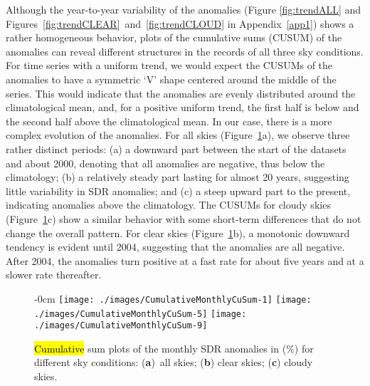\documentclass[applsci,article,accept,moreauthors,pdftex]{Definitions/mdpi}
\begin{document}
Although the year-to-year variability of the anomalies (Figure
\ref{fig:trendALL} and \mbox{Figures~\ref{fig:trendCLEAR} and
\ref{fig:trendCLOUD}} in \mbox{Appendix \ref{app1})} shows a rather homogeneous behavior,
plots of the cumulative sums (CUSUM) \citep{Regier2019} of the anomalies
can reveal different structures in the records of all three sky
conditions. For time series with a uniform trend, we would expect the
CUSUMs of the anomalies to have a symmetric `V' shape centered around
the middle of the series. This would indicate that the anomalies are
evenly distributed around the climatological mean, and, for a positive
uniform trend, the first half is below and the second half above the
climatological mean. In our case, there is a more complex evolution of
the anomalies. For all skies (Figure~\ref{fig:cusummonth}a), we observe
three rather distinct periods: (a) a downward part between the start of
the datasets and about 2000, denoting that all anomalies are negative,
thus below the climatology; (b) a relatively steady part lasting for
almost 20 years, suggesting little variability in SDR anomalies; and (c) a
steep upward part to the present, indicating anomalies above the climatology.
The CUSUMs for cloudy skies (Figure~\ref{fig:cusummonth}c) show a
similar behavior with some short-term differences that do not change the
overall pattern. For clear skies (Figure~\ref{fig:cusummonth}b), a
monotonic downward tendency is evident until 2004, suggesting that the
anomalies are all negative. After 2004, the anomalies turn positive at
a fast rate for about five years and at a slower rate thereafter.

\begin{figure}[H]
    \begin{adjustwidth}{-\extralength}{0cm}
        {\centering 
            {\texttt{[image: ./images/CumulativeMonthlyCuSum-1]}}\hfill
            {\texttt{[image: ./images/CumulativeMonthlyCuSum-5]}}\hfill
            {\texttt{[image: ./images/CumulativeMonthlyCuSum-9]}}\hfill
        }
\end{adjustwidth}
\caption{\hl{Cumulative} %
 sum plots of the monthly SDR anomalies in (\%) for different sky conditions: (\textbf{a})~all skies; (\textbf{b}) clear skies; (\textbf{c}) cloudy skies.}\label{fig:cusummonth}

\end{figure}
\end{document}
